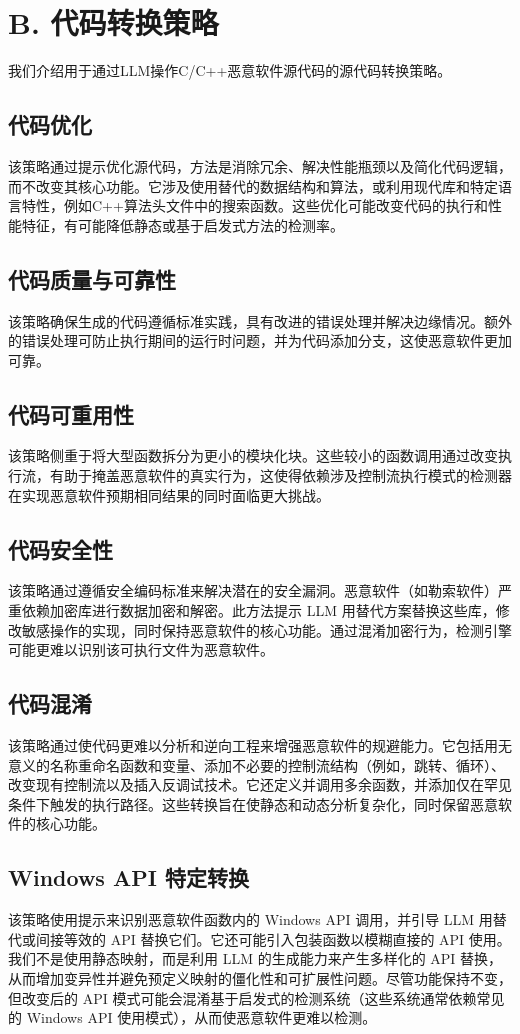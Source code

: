 \section{B. 代码转换策略}
我们介绍用于通过LLM操作C/C++恶意软件源代码的源代码转换策略。

\subsection{代码优化}
该策略通过提示优化源代码，方法是消除冗余、解决性能瓶颈以及简化代码逻辑，而不改变其核心功能。它涉及使用替代的数据结构和算法，或利用现代库和特定语言特性，例如C++算法头文件中的搜索函数。这些优化可能改变代码的执行和性能特征，有可能降低静态或基于启发式方法的检测率。

\subsection{代码质量与可靠性}
该策略确保生成的代码遵循标准实践，具有改进的错误处理并解决边缘情况。额外的错误处理可防止执行期间的运行时问题，并为代码添加分支，这使恶意软件更加可靠。

\subsection{代码可重用性}
该策略侧重于将大型函数拆分为更小的模块化块。这些较小的函数调用通过改变执行流，有助于掩盖恶意软件的真实行为，这使得依赖涉及控制流执行模式的检测器在实现恶意软件预期相同结果的同时面临更大挑战。

\subsection{代码安全性}
该策略通过遵循安全编码标准来解决潜在的安全漏洞。恶意软件（如勒索软件）严重依赖加密库进行数据加密和解密。此方法提示 LLM 用替代方案替换这些库，修改敏感操作的实现，同时保持恶意软件的核心功能。通过混淆加密行为，检测引擎可能更难以识别该可执行文件为恶意软件。

\subsection{代码混淆}
该策略通过使代码更难以分析和逆向工程来增强恶意软件的规避能力。它包括用无意义的名称重命名函数和变量、添加不必要的控制流结构（例如，跳转、循环）、改变现有控制流以及插入反调试技术。它还定义并调用多余函数，并添加仅在罕见条件下触发的执行路径。这些转换旨在使静态和动态分析复杂化，同时保留恶意软件的核心功能。

\subsection{Windows API 特定转换}
该策略使用提示来识别恶意软件函数内的 Windows API 调用，并引导 LLM 用替代或间接等效的 API 替换它们。它还可能引入包装函数以模糊直接的 API 使用。我们不是使用静态映射，而是利用 LLM 的生成能力来产生多样化的 API 替换，从而增加变异性并避免预定义映射的僵化性和可扩展性问题。尽管功能保持不变，但改变后的 API 模式可能会混淆基于启发式的检测系统（这些系统通常依赖常见的 Windows API 使用模式），从而使恶意软件更难以检测。